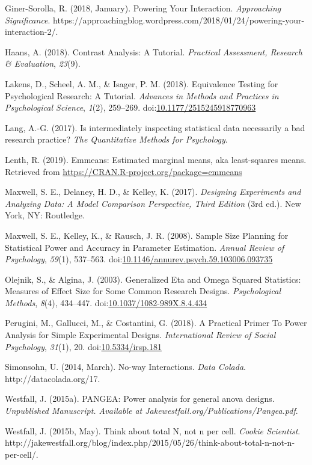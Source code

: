 \documentclass[
  ,jou,floatsintext]{apa6}
\begin{document}
\leavevmode\hypertarget{ref-giner-sorolla_powering_2018}{}%
Giner-Sorolla, R. (2018, January). Powering Your Interaction. \emph{Approaching Significance}. https://approachingblog.wordpress.com/2018/01/24/powering-your-interaction-2/.

\leavevmode\hypertarget{ref-haans_contrast_2018}{}%
Haans, A. (2018). Contrast Analysis: A Tutorial. \emph{Practical Assessment, Research \& Evaluation}, \emph{23}(9).

\leavevmode\hypertarget{ref-lakens_equivalence_2018}{}%
Lakens, D., Scheel, A. M., \& Isager, P. M. (2018). Equivalence Testing for Psychological Research: A Tutorial. \emph{Advances in Methods and Practices in Psychological Science}, \emph{1}(2), 259--269. doi:\href{https://doi.org/10.1177/2515245918770963}{10.1177/2515245918770963}

\leavevmode\hypertarget{ref-lang2017intermediately}{}%
Lang, A.-G. (2017). Is intermediately inspecting statistical data necessarily a bad research practice? \emph{The Quantitative Methods for Psychology}.

\leavevmode\hypertarget{ref-lenthemmeans}{}%
Lenth, R. (2019). Emmeans: Estimated marginal means, aka least-squares means. Retrieved from \url{https://CRAN.R-project.org/package=emmeans}

\leavevmode\hypertarget{ref-maxwell_designing_2017}{}%
Maxwell, S. E., Delaney, H. D., \& Kelley, K. (2017). \emph{Designing Experiments and Analyzing Data: A Model Comparison Perspective, Third Edition} (3rd ed.). New York, NY: Routledge.

\leavevmode\hypertarget{ref-maxwell_sample_2008}{}%
Maxwell, S. E., Kelley, K., \& Rausch, J. R. (2008). Sample Size Planning for Statistical Power and Accuracy in Parameter Estimation. \emph{Annual Review of Psychology}, \emph{59}(1), 537--563. doi:\href{https://doi.org/10.1146/annurev.psych.59.103006.093735}{10.1146/annurev.psych.59.103006.093735}

\leavevmode\hypertarget{ref-olejnik_generalized_2003}{}%
Olejnik, S., \& Algina, J. (2003). Generalized Eta and Omega Squared Statistics: Measures of Effect Size for Some Common Research Designs. \emph{Psychological Methods}, \emph{8}(4), 434--447. doi:\href{https://doi.org/10.1037/1082-989X.8.4.434}{10.1037/1082-989X.8.4.434}

\leavevmode\hypertarget{ref-perugini_practical_2018}{}%
Perugini, M., Gallucci, M., \& Costantini, G. (2018). A Practical Primer To Power Analysis for Simple Experimental Designs. \emph{International Review of Social Psychology}, \emph{31}(1), 20. doi:\href{https://doi.org/10.5334/irsp.181}{10.5334/irsp.181}

\leavevmode\hypertarget{ref-simonsohn_no-way_2014}{}%
Simonsohn, U. (2014, March). No-way Interactions. \emph{Data Colada}. http://datacolada.org/17.

\leavevmode\hypertarget{ref-westfall2015pangea}{}%
Westfall, J. (2015a). PANGEA: Power analysis for general anova designs. \emph{Unpublished Manuscript. Available at Jakewestfall.org/Publications/Pangea.pdf}.

\leavevmode\hypertarget{ref-westfall_think_2015}{}%
Westfall, J. (2015b, May). Think about total N, not n per cell. \emph{Cookie Scientist}. http://jakewestfall.org/blog/index.php/2015/05/26/think-about-total-n-not-n-per-cell/.
\end{document}
